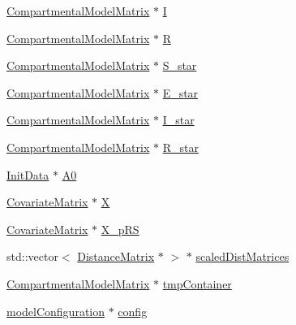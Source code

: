 \begin{DoxyCompactItemize}
\item 
\hyperlink{classSpatialSEIR_1_1CompartmentalModelMatrix}{Compartmental\-Model\-Matrix} $\ast$ \hyperlink{classSpatialSEIR_1_1ModelContext_aa68b54ddf89a3ea432433dfb09c7983f}{I}
\item 
\hyperlink{classSpatialSEIR_1_1CompartmentalModelMatrix}{Compartmental\-Model\-Matrix} $\ast$ \hyperlink{classSpatialSEIR_1_1ModelContext_a97ad90554c0f23cc4137661285df3213}{R}
\item 
\hyperlink{classSpatialSEIR_1_1CompartmentalModelMatrix}{Compartmental\-Model\-Matrix} $\ast$ \hyperlink{classSpatialSEIR_1_1ModelContext_a6fce6827d821ab06e57abe08e6f6c4cb}{S\-\_\-star}
\item 
\hyperlink{classSpatialSEIR_1_1CompartmentalModelMatrix}{Compartmental\-Model\-Matrix} $\ast$ \hyperlink{classSpatialSEIR_1_1ModelContext_a92a044fd49fd0d4996dd38a38f3f14a9}{E\-\_\-star}
\item 
\hyperlink{classSpatialSEIR_1_1CompartmentalModelMatrix}{Compartmental\-Model\-Matrix} $\ast$ \hyperlink{classSpatialSEIR_1_1ModelContext_adf47583e6bd65b272ea17dc84620e09f}{I\-\_\-star}
\item 
\hyperlink{classSpatialSEIR_1_1CompartmentalModelMatrix}{Compartmental\-Model\-Matrix} $\ast$ \hyperlink{classSpatialSEIR_1_1ModelContext_a03a86c851b58cf707ed0e0f734f01780}{R\-\_\-star}
\item 
\hyperlink{classSpatialSEIR_1_1InitData}{Init\-Data} $\ast$ \hyperlink{classSpatialSEIR_1_1ModelContext_abe200f29b14eee50f6626d6280596785}{A0}
\item 
\hyperlink{classSpatialSEIR_1_1CovariateMatrix}{Covariate\-Matrix} $\ast$ \hyperlink{classSpatialSEIR_1_1ModelContext_ab92eeb3b5c0ee046321578f1b7fccea3}{X}
\item 
\hyperlink{classSpatialSEIR_1_1CovariateMatrix}{Covariate\-Matrix} $\ast$ \hyperlink{classSpatialSEIR_1_1ModelContext_ab4a6806ee81ecdd67ef14f40694a066c}{X\-\_\-p\-R\-S}
\item 
std\-::vector$<$ \hyperlink{classSpatialSEIR_1_1DistanceMatrix}{Distance\-Matrix} $\ast$ $>$ $\ast$ \hyperlink{classSpatialSEIR_1_1ModelContext_a7e263c5ae20ecdc892053a2588903459}{scaled\-Dist\-Matrices}
\item 
\hyperlink{classSpatialSEIR_1_1CompartmentalModelMatrix}{Compartmental\-Model\-Matrix} $\ast$ \hyperlink{classSpatialSEIR_1_1ModelContext_ae4569072f48495d446ef85968cb9a42d}{tmp\-Container}
\item 
\hyperlink{structSpatialSEIR_1_1modelConfiguration}{model\-Configuration} $\ast$ \hyperlink{classSpatialSEIR_1_1ModelContext_a7c8c2708dabbc0a32bf32252942b3a12}{config}

\end{DoxyCompactItemize}
